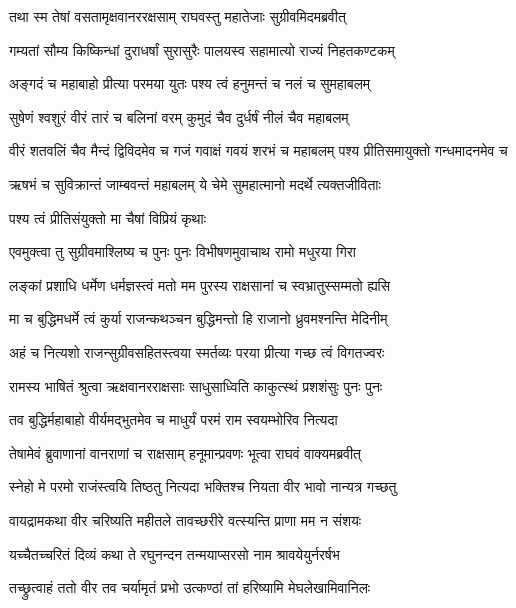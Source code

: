 
\twolineshloka
{तथा स्म तेषां वसतामृक्षवानररक्षसाम्}
{राघवस्तु महातेजाः सुग्रीवमिदमब्रवीत्} %

\twolineshloka
{गम्यतां सौम्य किष्किन्धां दुराधर्षां सुरासुरैः}
{पालयस्व सहामात्यो राज्यं निहतकण्टकम्} %

\twolineshloka
{अङ्गदं च महाबाहो प्रीत्या परमया युतः}
{पश्य त्वं हनुमन्तं च नलं च सुमहाबलम्} %

\twolineshloka
{सुषेणं श्वशुरं वीरं तारं च बलिनां वरम्}
{कुमुदं चैव दुर्धर्षं नीलं चैव महाबलम्} %

\threelineshloka
{वीरं शतवलिं चैव मैन्दं द्विविदमेव च}
{गजं गवाक्षं गवयं शरभं च महाबलम्}
{पश्य प्रीतिसमायुक्तो गन्धमादनमेव च} %

\twolineshloka
{ऋषभं च सुविक्रान्तं जाम्बवन्तं महाबलम्}
{ये चेमे सुमहात्मानो मदर्थे त्यक्तजीविताः} %

\onelineshloka
{पश्य त्वं प्रीतिसंयुक्तो मा चैषां विप्रियं कृथाः} %

\twolineshloka
{एवमुक्त्वा तु सुग्रीवमाश्लिष्य च पुनः पुनः}
{विभीषणमुवाचाथ रामो मधुरया गिरा} %

\twolineshloka
{लङ्कां प्रशाधि धर्मेण धर्मज्ञस्त्वं मतो मम}
{पुरस्य राक्षसानां च स्वभ्रातुस्सम्मतो ह्यसि} %

\twolineshloka
{मा च बुद्धिमधर्मे त्वं कुर्या राजन्कथञ्चन}
{बुद्धिमन्तो हि राजानो ध्रुवमश्नन्ति मेदिनीम्} %

\twolineshloka
{अहं च नित्यशो राजन्सुग्रीवसहितस्त्वया}
{स्मर्तव्यः परया प्रीत्या गच्छ त्वं विगतज्वरः} %

\twolineshloka
{रामस्य भाषितं श्रुत्वा ऋक्षवानरराक्षसाः}
{साधुसाध्विति काकुत्स्थं प्रशशंसुः पुनः पुनः} %

\twolineshloka
{तव बुद्धिर्महाबाहो वीर्यमद्भुतमेव च}
{माधुर्यं परमं राम स्वयम्भोरिव नित्यदा} %

\twolineshloka
{तेषामेवं ब्रुवाणानां वानराणां च राक्षसाम्}
{हनूमान्प्रवणः भूत्वा राघवं वाक्यमब्रवीत्} %

\twolineshloka
{स्नेहो मे परमो राजंस्त्वयि तिष्ठतु नित्यदा}
{भक्तिश्च नियता वीर भावो नान्यत्र गच्छतु} %

\twolineshloka
{वायद्रामकथा वीर चरिष्यति महीतले}
{तावच्छरीरे वत्स्यन्ति प्राणा मम न संशयः} %

\twolineshloka
{यच्चैतच्चरितं दिव्यं कथा ते रघुनन्दन}
{तन्मयाप्सरसो नाम श्रावयेयुर्नरर्षभ} %

\twolineshloka
{तच्छ्रुत्वाहं ततो वीर तव चर्यामृतं प्रभो}
{उत्कण्ठां तां हरिष्यामि मेघलेखामिवानिलः} %

